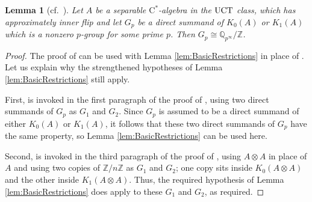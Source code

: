 \documentclass[a4paper,10pt]{amsart}
\newcommand{\T}[1]{\textup{#1}}
\newcommand{\cstar}{\ensuremath{\mathrm C^\ast}}
\newcounter{theorem}
\newtheorem{lemma}[theorem]{Lemma}
\numberwithin{equation}{section}
\numberwithin{theorem}{section}
\newcommand{\Q}{\mathbb{Q}}
\newcommand{\Z}{\mathbb{Z}}
\begin{document}
\begin{lemma}[{cf.~\cite[Lemma 6.4]{aifK}}]
\label{lem:NoCycSummand}
Let $A$ be a separable $\cstar$-algebra in the $\T{UCT}$ class, which has approximately inner flip and let $G_p$ be a direct summand of $K_0(A)$ or $K_1(A)$ which is a nonzero $p$-group for some prime $p$.
Then $G_p \cong \Q_{p^\infty}/\Z$.
\end{lemma}

\begin{proof}
The proof of \cite[Lemma 6.4 (i)]{aifK} can be used with Lemma \ref{lem:BasicRestrictions} in place of \cite[Lemma 6.2]{aifK}.
Let us explain why the strengthened hypotheses of Lemma \ref{lem:BasicRestrictions} still apply.

First, \cite[Lemma 6.2 (i)]{aifK} is invoked in the first paragraph of the proof of \cite[Lemma 6.4 (i)]{aifK}, using two direct summands of $G_p$ as $G_1$ and $G_2$.
Since $G_p$ is assumed to be a direct summand of either $K_0(A)$ or $K_1(A)$, it follows that these two direct summands of $G_p$ have the same property, so Lemma \ref{lem:BasicRestrictions} can be used here.

Second, \cite[Lemma 6.2 (ii)]{aifK} is invoked in the third paragraph of the proof of \cite[Lemma 6.4 (i)]{aifK}, using $A\otimes A$ in place of $A$ and using two copies of $\Z/n\Z$ as $G_1$ and $G_2$; one copy sits inside $K_0(A\otimes A)$ and the other inside $K_1(A\otimes A)$.
Thus, the required hypothesis of Lemma \ref{lem:BasicRestrictions} does apply to these $G_1$ and $G_2$, as required.
\end{proof}
\end{document}
